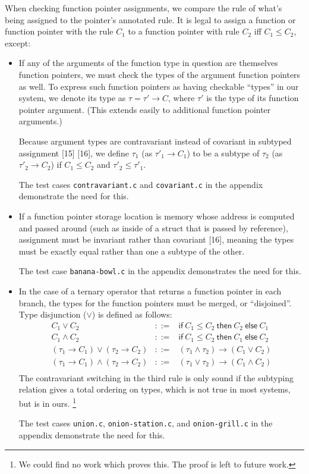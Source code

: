 \documentclass{article}
\begin{document}
When checking function pointer assignments, we compare the rule of what's being assigned to the pointer's annotated rule. It is legal to assign a function or function pointer with the rule $C_1$ to a function pointer with rule $C_2$ iff $C_1 \le C_2$, except:

\begin{itemize}
	\item If any of the arguments of the function type in question are themselves function pointers, we must check the types of the argument function pointers as well.
		To express such function pointers as having checkable ``types'' in our system, we denote its type as $\tau = \tau' \rightarrow C$, where $\tau'$ is the type of its function pointer argument. (This extends easily to additional function pointer arguments.)
		
		Because argument types are contravariant instead of covariant in subtyped assignment [15] [16], we define $\tau_1$ (as $\tau'_1 \rightarrow C_1$) to be a subtype of $\tau_2$ (as $\tau'_2 \rightarrow C_2$) if $C_1 \le C_2$ and $\tau'_2 \le \tau'_1$.

		The test cases \texttt{contravariant.c} and \texttt{covariant.c} in the appendix demonstrate the need for this.
	\item If a function pointer storage location is memory whose address is computed and passed around (such as inside of a struct that is passed by reference), assignment must be invariant rather than covariant [16], meaning the types must be exactly equal rather than one a subtype of the other.

		The test case \texttt{banana-bowl.c} in the appendix demonstrates the need for this.
	\item In the case of a ternary operator that returns a function pointer in each branch, the types for the function pointers must be merged, or ``disjoined''. Type disjunction ($\vee$) is defined as follows:
		\begin{eqnarray*}
			C_1 \vee C_2 & ::= & \mathsf{if}~C_1\le C_2~\mathsf{then}~C_2~\mathsf{else}~C_1 \\
			C_1 \wedge C_2 & ::= & \mathsf{if}~C_1\le C_2~\mathsf{then}~C_1~\mathsf{else}~C_2 \\
			(\tau_1 \rightarrow C_1) \vee (\tau_2 \rightarrow C_2) & ::= & (\tau_1 \wedge \tau_2) \rightarrow (C_1 \vee C_2) \\
			(\tau_1 \rightarrow C_1) \wedge (\tau_2 \rightarrow C_2) & ::= & (\tau_1 \vee \tau_2) \rightarrow (C_1 \wedge C_2) \\
		\end{eqnarray*}
		The contravariant switching in the third rule is only sound if the subtyping relation gives a total ordering on types, which is not true in most systems, but is in ours.
		\footnote{We could find no work which proves this. The proof is left to future work.}

		The test cases \texttt{union.c}, \texttt{onion-station.c}, and \texttt{onion-grill.c} in the appendix demonstrate the need for this.
\end{itemize}
\end{document}

